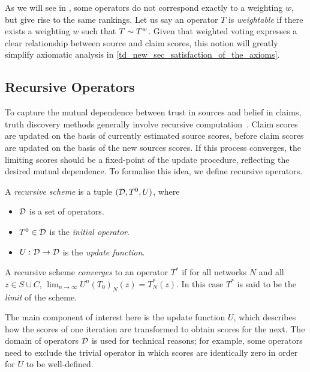 As we will see in , some operators do not correspond
exactly to a weighting $w$, but give rise to the same rankings. Let us say an
operator $T$ is \emph{weightable} if there exists a weighting $w$ such that $T
\sim T^{w}$. Given that weighted voting expresses a clear
relationship between source and claim scores, this notion will greatly simplify
axiomatic analysis in \cref{td_new_sec_satisfaction_of_the_axioms}. 

\subsection{Recursive Operators}
\label{td_new_sec_recursive_operators}

To capture the mutual dependence between trust in sources and belief in claims,
truth discovery methods generally involve recursive
computation~\cite{pasternack2010,yin2008,yang_probabilistic_2019,du2019,zhang2018,li2016,galland2010,zhi2015}.
Claim scores are updated on the basis of currently estimated source scores,
before claim scores are updated on the basis of the new sources scores. If this
process converges, the limiting scores should be a fixed-point of the update
procedure, reflecting the desired mutual dependence. To formalise this idea, we
define recursive operators.

\begin{definition}
    \label{td_new_def_recursive_scheme}
    A \emph{recursive scheme} is a tuple $(\mathcal{D}, T^0, U)$, where
    \begin{itemize}
        \item $\mathcal{D}$ is a set of operators.
        \item $T^0 \in \mathcal{D}$ is the \emph{initial operator}.
        \item $U: \mathcal{D} \to \mathcal{D}$ is the \emph{update function}.
    \end{itemize}
    A recursive scheme \emph{converges} to an operator $T^*$ if for all
    networks $N$ and all $z \in S \cup C$, $\lim_{n \to \infty}{U^n(T_0)_N(z)}
    = T^*_N(z)$. In this case $T^*$ is said to be the \emph{limit} of the
    scheme.
\end{definition}

The main component of interest here is the update function $U$, which describes
how the scores of one iteration are transformed to obtain scores for the next.
The domain of operators $\mathcal{D}$ is used for technical reasons; for example, some
operators need to exclude the trivial operator in which scores are identically
zero in order for $U$ to be well-defined.

